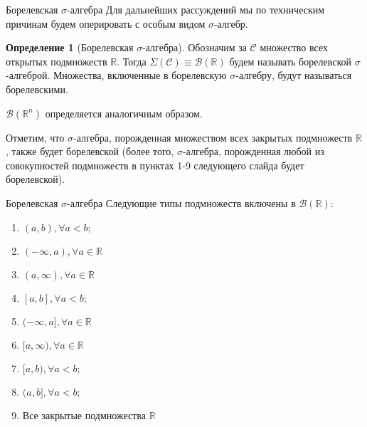 \documentclass{beamer}%
\theoremstyle{definition}
\newtheorem{mydef}[theorem]{Определение}
\begin{document}
\begin{frame}{Борелевская $\sigma$-алгебра}
Для дальнейших рассуждений мы по техническим причинам будем оперировать с особым видом $\sigma$-алгебр.

\begin{mydef}[Борелевская $\sigma$-алгебра]
Обозначим за $\mathcal{C}$ множество всех открытых подмножеств $\mathbb{R}$. Тогда $\Sigma(\mathcal{C}) \equiv \mathcal{B}(\mathbb{R})$ будем называть борелевской $\sigma$-алгеброй. Множества, включенные в борелевскую $\sigma$-алгебру, будут называться борелевскими. 

$\mathcal{B}(\mathbb{R}^n)$ определяется аналогичным образом.
    
\end{mydef}

Отметим, что $\sigma$-алгебра, порожденная множеством всех закрытых подмножеств $\mathbb{R}$, также будет борелевской (более того, $\sigma$-алгебра, порожденная любой из совокупностей подмножеств в пунктах 1-9 следующего слайда будет борелевской).

\end{frame}



\begin{frame}{Борелевская $\sigma$-алгебра}
Следующие типы подмножеств включены в $\mathcal{B}(\mathbb{R})$:
\begin{enumerate}
    \item $(a, b), \forall a < b;$
    \item $(-\infty, a), \forall a \in \mathbb{R}$
    \item $(a, \infty), \forall a \in \mathbb{R}$
    \item $[a, b], \forall a < b;$
    \item $(-\infty, a], \forall a \in \mathbb{R}$
    \item $[a, \infty), \forall a \in \mathbb{R}$
    \item $[a, b), \forall a < b;$
    \item $(a, b], \forall a < b;$
    \item Все закрытые подмножества $\mathbb{R}$
\end{enumerate}
\end{frame}
\end{document}
